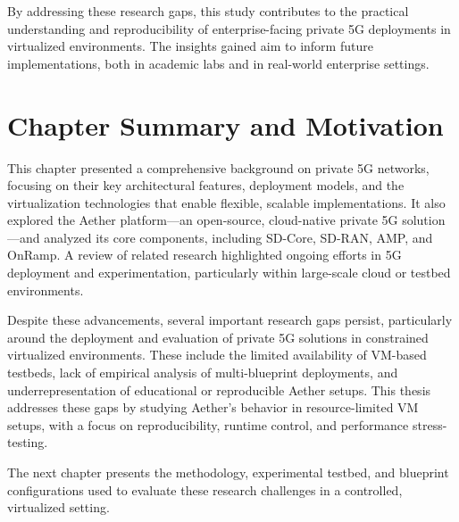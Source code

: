 By addressing these research gaps, this study contributes to the practical understanding and reproducibility of enterprise-facing private 5G deployments in virtualized environments. The insights gained aim to inform future implementations, both in academic labs and in real-world enterprise settings.

\section{Chapter Summary and Motivation}
\label{sec:chapter2_summary}

This chapter presented a comprehensive background on private 5G networks, focusing on their key architectural features, deployment models, and the virtualization technologies that enable flexible, scalable implementations. It also explored the Aether platform—an open-source, cloud-native private 5G solution—and analyzed its core components, including SD-Core, SD-RAN, AMP, and OnRamp. A review of related research highlighted ongoing efforts in 5G deployment and experimentation, particularly within large-scale cloud or testbed environments.

Despite these advancements, several important research gaps persist, particularly around the deployment and evaluation of private 5G solutions in constrained virtualized environments. These include the limited availability of VM-based testbeds, lack of empirical analysis of multi-blueprint deployments, and underrepresentation of educational or reproducible Aether setups. This thesis addresses these gaps by studying Aether’s behavior in resource-limited VM setups, with a focus on reproducibility, runtime control, and performance stress-testing.

The next chapter presents the methodology, experimental testbed, and blueprint configurations used to evaluate these research challenges in a controlled, virtualized setting.
